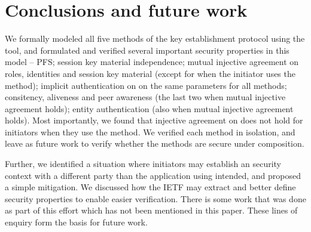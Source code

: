 \documentclass[runningheads, envcountsame, hidelinks, a4paper, draft, x11names]{llncs}
\begin{document}
\section{Conclusions and future work}
\label{sec:conclusions}
We formally modeled all five
methods of the \mEdhoc{} key establishment protocol using the \mTamarin{} tool, and
formulated and verified several important security properties in this model --
PFS; session key material independence; mutual injective agreement on roles, identities and session key material
(except for when the initiator uses the \mStat{} method); implicit
authentication on on the same parameters for all methods; consitency, aliveness
and peer awareness (the last two when mutual injective agreement holds);
entity authentication (also when mutual injective agreement holds).
%
%
Most importantly, we found that injective agreement on \mGiy{} does not hold for
initiators when they use the \mStat{} method.
%
We verified each method in isolation, and leave as future work to verify whether
the methods are secure under composition.
%


Further, we identified a situation where initiators may establish an \mOscore{}
security context with a different party than the application using \mEdhoc{}
intended, and proposed a simple mitigation.
%
We discussed how the IETF may extract and better define security properties to
enable easier verification.
%
There is some work that was done as part of this effort which has not been mentioned in this paper. These lines of enquiry form the basis for future work.
\end{document}
